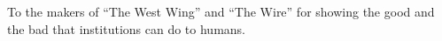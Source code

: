
\clearpage

\centering

\thispagestyle{empty}

\vspace*{\fill} %
	To the makers of ``The West Wing'' and ``The Wire'' for showing the good and the bad that institutions can do to humans. %

\vspace*{\fill} %